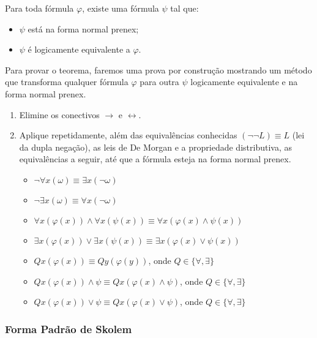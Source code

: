 \begin{theorem}{}
    Para toda fórmula $\varphi$, existe uma fórmula $\psi$ tal que:
    \begin{itemize}
        \item $\psi$ está na forma normal prenex;
        \item $\psi$ é logicamente equivalente a $\varphi$.
    \end{itemize}
    Para provar o teorema, faremos uma prova por construção mostrando um método que transforma qualquer fórmula $\varphi$ para outra $\psi$ logicamente equivalente e na forma normal prenex.
    \begin{enumerate}
        \item Elimine os conectivos $\rightarrow$ e $\leftrightarrow$.
        \item Aplique repetidamente, além das equivalências conhecidas $(\neg \neg L) \equiv L$ (lei da dupla negação), as leis de De Morgan e a propriedade distributiva, as equivalências a seguir, até que a fórmula esteja na forma normal prenex.
        \begin{itemize}
            \item $\neg \forall x (\omega) \equiv \exists x (\neg \omega)$
            \item $\neg \exists x (\omega) \equiv \forall x (\neg \omega)$
            \item $\forall x (\varphi(x)) \land \forall x (\psi(x)) \equiv \forall x (\varphi(x) \land \psi(x))$
            \item $\exists x (\varphi(x)) \lor \exists x (\psi(x)) \equiv \exists x (\varphi(x) \lor \psi(x))$
            \item $Q x (\varphi(x))\equiv Q y(\varphi(y))$, onde $Q \in \{\forall, \exists\}$
            \item $Q x (\varphi(x)) \land \psi \equiv Q x (\varphi(x) \land \psi)$, onde $Q \in \{\forall, \exists\}$ 
            \item $Q x (\varphi(x)) \lor \psi \equiv Q x (\varphi(x) \lor \psi)$, onde $Q \in \{\forall, \exists\}$ 
        \end{itemize}
    \end{enumerate}
\end{theorem}

\subsubsection{Forma Padrão de Skolem}


